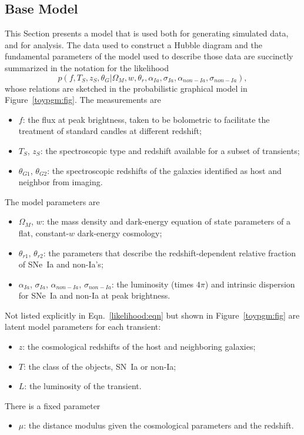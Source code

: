 \documentclass[preprint,3p]{elsarticle}
\begin{document}
\subsection{Base Model}
\label{model:sec}
This Section presents a model that is used both for generating simulated data, and for analysis.
The data used to construct a Hubble diagram and the fundamental parameters of the
model used to describe those data are succinctly summarized in the notation
for the likelihood 
\begin{equation}
p(f, {{T}}_S,{{z}}_S, \theta_G|  \Omega_M, w, \theta_r,\alpha_{Ia},\sigma_{Ia}, \alpha_{\mathit{non-Ia}},\sigma_{\mathit{non-Ia}}),
\label{likelihood:eqn}
\end{equation}
whose relations are sketched in the probabilistic graphical model in Figure~\ref{toypgm:fig}.
The measurements are
\begin{itemize}
\item $f$: the flux at peak brightness, taken 
to be bolometric to facilitate the treatment of
standard candles at different redshift;
\item ${{T}}_S$, ${{z}}_S$: the spectroscopic type and redshift available for a subset of transients;
\item $\theta_{G1}$, $\theta_{G2}$: the spectroscopic redshifts of the galaxies identified
as host and neighbor from imaging.
\end{itemize}
The model parameters are
\begin{itemize}
\item $\Omega_M$, $w$: the mass density and dark-energy equation of state parameters of a flat,
constant-$w$ dark-energy cosmology;
\item $\theta_{r1}$, $\theta_{r2}$:  the parameters
that describe the redshift-dependent relative fraction of SNe~Ia and non-Ia's;
\item $\alpha_{Ia}$, $\sigma_{Ia}$, $\alpha_{\mathit{non-Ia}}$, $\sigma_{\mathit{non-Ia}}$:
the luminosity (times $4\pi$) and intrinsic dispersion for SNe~Ia and non-Ia at peak brightness.
\end{itemize}
Not listed explicitly in Eqn.~\ref{likelihood:eqn} but shown in Figure~\ref{toypgm:fig} are latent model parameters for each transient:
\begin{itemize}
\item $z$: the cosmological redshifts of the host and neighboring galaxies;
\item $T$: the class of the objects, SN~Ia or non-Ia;
\item $L$: the luminosity of the transient.
\end{itemize}
There is a  fixed parameter
\begin{itemize}
\item $\mu$: the distance modulus given the cosmological parameters and the redshift.
\end{itemize}
\end{document}
